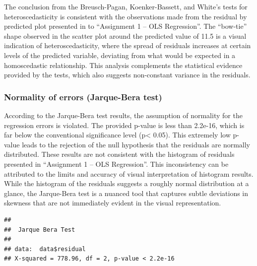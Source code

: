 \documentclass[
]{article}
\newenvironment{Shaded}{\begin{snugshade}}{\end{snugshade}}
\newcommand{\CommentTok}[1]{\textcolor[rgb]{0.56,0.35,0.01}{\textit{#1}}}
\newcommand{\FunctionTok}[1]{\textcolor[rgb]{0.13,0.29,0.53}{\textbf{#1}}}
\newcommand{\NormalTok}[1]{#1}
\newcommand{\SpecialCharTok}[1]{\textcolor[rgb]{0.81,0.36,0.00}{\textbf{#1}}}
\begin{document}
The conclusion from the Breusch-Pagan, Koenker-Bassett, and White's
tests for heteroscedasticity is consistent with the observations made
from the residual by predicted plot presented in to ``Assignment 1 --
OLS Regression''. The ``bow-tie'' shape observed in the scatter plot
around the predicted value of 11.5 is a visual indication of
heteroscedasticity, where the spread of residuals increases at certain
levels of the predicted variable, deviating from what would be expected
in a homoscedastic relationship. This analysis complements the
statistical evidence provided by the tests, which also suggests
non-constant variance in the residuals.

\hypertarget{normality-of-errors-jarque-bera-test}{%
\subsubsection{Normality of errors (Jarque-Bera
test)}\label{normality-of-errors-jarque-bera-test}}

According to the Jarque-Bera test results, the assumption of normality
for the regression errors is violated. The provided p-value is less than
2.2e-16, which is far below the conventional significance level
(p\textless{} 0.05). This extremely low p-value leads to the rejection
of the null hypothesis that the residuals are normally distributed.
These results are not consistent with the histogram of residuals
presented in ``Assignment 1 -- OLS Regression''. This inconsistency can
be attributed to the limits and accuracy of visual interpretation of
histogram results. While the histogram of the residuals suggests a
roughly normal distribution at a glance, the Jarque-Bera test is a
nuanced tool that captures subtle deviations in skewness that are not
immediately evident in the visual representation.

\begin{Shaded}
\end{Shaded}

\begin{verbatim}
## 
##  Jarque Bera Test
## 
## data:  data$residual
## X-squared = 778.96, df = 2, p-value < 2.2e-16
\end{verbatim}
\end{document}
